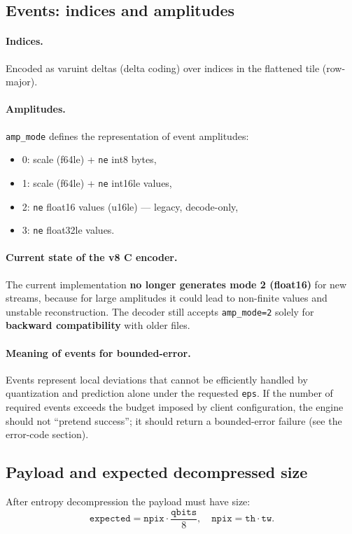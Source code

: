 \documentclass[11pt,a4paper]{article}
\begin{document}
\subsection{Events: indices and amplitudes}
\paragraph{Indices.}
Encoded as varuint deltas (delta coding) over indices in the flattened tile (row-major).

\paragraph{Amplitudes.}
\texttt{amp\_mode} defines the representation of event amplitudes:
\begin{itemize}
  \item 0: scale (f64le) + \texttt{ne} int8 bytes,
  \item 1: scale (f64le) + \texttt{ne} int16le values,
  \item 2: \texttt{ne} float16 values (u16le) --- legacy, decode-only,
  \item 3: \texttt{ne} float32le values.
\end{itemize}

\paragraph{Current state of the v8 C encoder.}
The current implementation \textbf{no longer generates mode 2 (float16)} for new streams, because for large amplitudes it could lead to non-finite values and unstable reconstruction. The decoder still accepts \texttt{amp\_mode=2} solely for \textbf{backward compatibility} with older files.

\paragraph{Meaning of events for bounded-error.}
Events represent local deviations that cannot be efficiently handled by quantization and prediction alone under the requested \texttt{eps}. If the number of required events exceeds the budget imposed by client configuration, the engine should not ``pretend success''; it should return a bounded-error failure (see the error-code section).

\subsection{Payload and expected decompressed size}
After entropy decompression the payload must have size:
\[
  \texttt{expected} = \texttt{npix}\cdot \frac{\texttt{qbits}}{8},
  \quad \texttt{npix}=\texttt{th}\cdot\texttt{tw}.
\]
\end{document}
